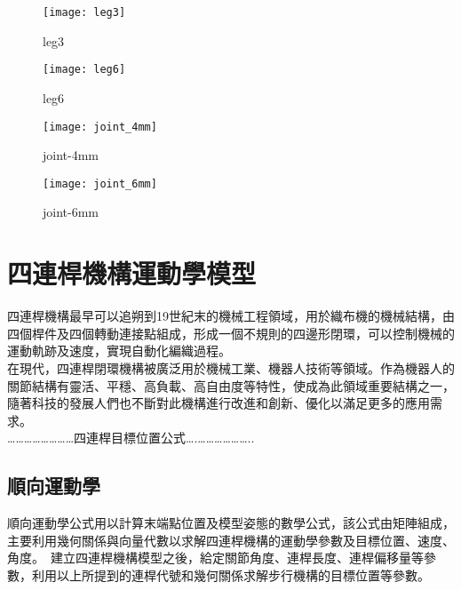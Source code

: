 \begin{figure}[htbp]
  \begin{minipage}[t]{0.45\linewidth}
    \centering
    \texttt{[image: leg3]}
    \caption{leg3}
    \label{leg3}
  \end{minipage}
  \hfill
  \begin{minipage}[t]{0.45\linewidth}
    \centering
    \texttt{[image: leg6]}
    \caption{leg6}
    \label{leg6}
  \end{minipage}
\end{figure}

\begin{figure}[htbp]
  \begin{minipage}[t]{0.45\linewidth}
    \centering
    \texttt{[image: joint\_4mm]}
    \caption{joint-4mm}
    \label{joint-4mm}
  \end{minipage}
  \hfill
  \begin{minipage}[t]{0.45\linewidth}
    \centering
    \texttt{[image: joint\_6mm]}
    \caption{joint-6mm}
    \label{joint-6mm}
  \end{minipage}
\end{figure}
\newpage

\section{四連桿機構運動學模型}

四連桿機構最早可以追朔到19世紀末的機械工程領域，用於織布機的機械結構，由四個桿件及四個轉動連接點組成，形成一個不規則的四邊形閉環，可以控制機械的運動軌跡及速度，實現自動化編織過程。\\
在現代，四連桿閉環機構被廣泛用於機械工業、機器人技術等領域。作為機器人的關節結構有靈活、平穩、高負載、高自由度等特性，使成為此領域重要結構之一，隨著科技的發展人們也不斷對此機構進行改進和創新、優化以滿足更多的應用需求。\\

……………………四連桿目標位置公式….………………..

\subsection{順向運動學}
順向運動學公式用以計算末端點位置及模型姿態的數學公式，該公式由矩陣組成，主要利用幾何關係與向量代數以求解四連桿機構的運動學參數及目標位置、速度、角度。\
建立四連桿機構模型之後，給定關節角度、連桿長度、連桿偏移量等參數，利用以上所提到的連桿代號和幾何關係求解步行機構的目標位置等參數。\\

